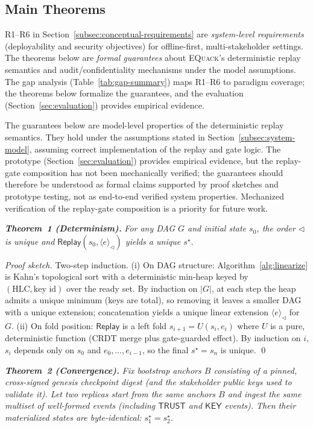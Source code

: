 \documentclass[10pt,journal,compsoc]{IEEEtran}
\newcommand{\equack}{\textsc{EQuack}}
\begin{document}
\subsection{Main Theorems}\label{subsec:main-theorems}

R1--R6 in Section~\ref{subsec:conceptual-requirements} are \emph{system-level requirements} (deployability and security objectives) for offline-first, multi-stakeholder settings.
The theorems below are \emph{formal guarantees} about \equack{}'s deterministic replay semantics and audit/confidentiality mechanisms under the model assumptions.
The gap analysis (Table~\ref{tab:gap-summary}) maps R1--R6 to paradigm coverage; the theorems below formalize the guarantees, and the evaluation (Section~\ref{sec:evaluation}) provides empirical evidence.

The guarantees below are model-level properties of the deterministic replay semantics. They hold under the assumptions stated in Section~\ref{subsec:system-model}, assuming correct implementation of the replay and gate logic. The prototype (Section~\ref{sec:evaluation}) provides empirical evidence, but the replay-gate composition has not been mechanically verified; the guarantees should therefore be understood as formal claims supported by proof sketches and prototype testing, not as end-to-end verified system properties. Mechanized verification of the replay-gate composition is a priority for future work.

\noindent\textbf{\textit{Theorem~1 (Determinism).}}
\textit{For any DAG $G$ and initial state $s_0$, the order $\triangleleft$ is unique and
$\mathsf{Replay}(s_0,\langle e\rangle_{\triangleleft})$ yields a unique $s^\star$.}


\textit{Proof sketch.} Two-step induction. (i) On DAG structure: Algorithm~\ref{alg:linearize} is Kahn's topological sort with a deterministic min-heap keyed by $(\text{HLC},\text{key id})$ over the ready set. By induction on $|G|$, at each step the heap admits a unique minimum (keys are total), so removing it leaves a smaller DAG with a unique extension; concatenation yields a unique linear extension $\langle e\rangle_{\triangleleft}$ for $G$. (ii) On fold position: $\mathsf{Replay}$ is a left fold $s_{i+1}=U(s_i,e_i)$ where $U$ is a pure, deterministic function (CRDT merge plus gate-guarded effect). By induction on $i$, $s_i$ depends only on $s_0$ and $e_0,\dots,e_{i-1}$, so the final $s^\star=s_n$ is unique. \qed


\noindent\textbf{\textit{Theorem~2 (Convergence).}}
\textit{Fix bootstrap anchors $B$ consisting of a pinned, cross-signed genesis checkpoint digest (and the stakeholder public keys used to validate it).
Let two replicas start from the same anchors $B$ and ingest the same multiset of well-formed events (including $\mathsf{TRUST}$ and $\mathsf{KEY}$ events).
Then their materialized states are byte-identical: $s^\star_1 = s^\star_2$.}
\end{document}
